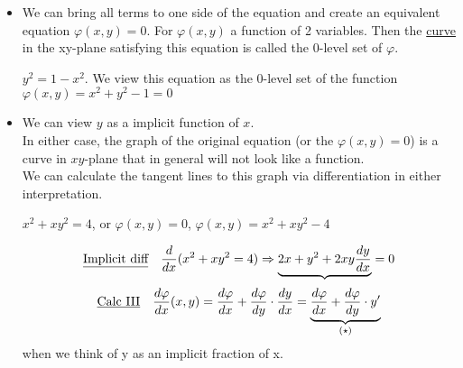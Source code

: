 \begin{itemize}
	\item We can bring all terms to one side of the equation and create an equivalent equation $\varphi (x, y) = 0$. For $\varphi (x,y)$ a function of 2 variables. Then the \underline{curve} in the xy-plane satisfying this equation is called the 0-level set of $\varphi$.
	\begin{example}
		$y^2 = 1-x^2$. We view this equation as the 0-level set of the function $\varphi(x,y) = x^2 + y^2 - 1 = 0$
	\end{example}
	\item We can view $y$ as a implicit function of $x$.\\
	In either case, the graph of the original equation (or the $\varphi(x,y) = 0$) is a curve in $xy$-plane that in general will not look like a function.\\
	We can calculate the tangent lines to this graph via differentiation in either interpretation.
	\begin{example}
		\begin{center}
			$x^2 + xy^2 = 4$, or $\varphi (x,y) = 0$, $\varphi (x,y) = x^2 + xy^2 - 4$
		\end{center}
		\begin{equation*}
			\text{\underline{Implicit diff}}\quad \dfrac{d}{dx}(x^2 +xy^2 = 4) \Rightarrow \underbrace{2x + y^2 +2xy \dfrac{dy}{dx}} = 0
		\end{equation*}	
		\begin{equation*}
			\text{\underline{Calc III}} \quad \dfrac{d \varphi}{dx}(x,y) = \dfrac{d \varphi}{dx} + \dfrac{d \varphi}{dy} \cdot \dfrac{dy}{dx} = \underbrace{\dfrac{d \varphi}{dx} + \dfrac{d \varphi}{dy} \cdot y'}_{(\star)}
		\end{equation*}
			{\tiny when we think of y as an implicit fraction of x.}
	\end{example}
\end{itemize}